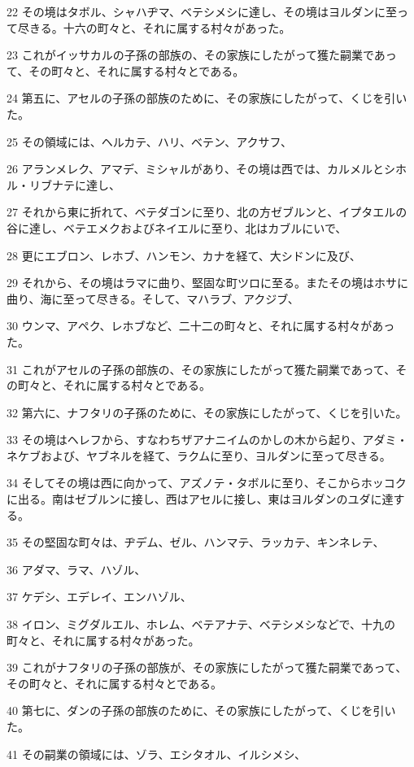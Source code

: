 \par 22 その境はタボル、シャハヂマ、ベテシメシに達し、その境はヨルダンに至って尽きる。十六の町々と、それに属する村々があった。
\par 23 これがイッサカルの子孫の部族の、その家族にしたがって獲た嗣業であって、その町々と、それに属する村々とである。
\par 24 第五に、アセルの子孫の部族のために、その家族にしたがって、くじを引いた。
\par 25 その領域には、ヘルカテ、ハリ、ベテン、アクサフ、
\par 26 アランメレク、アマデ、ミシャルがあり、その境は西では、カルメルとシホル・リブナテに達し、
\par 27 それから東に折れて、ベテダゴンに至り、北の方ゼブルンと、イプタエルの谷に達し、ベテエメクおよびネイエルに至り、北はカブルにいで、
\par 28 更にエブロン、レホブ、ハンモン、カナを経て、大シドンに及び、
\par 29 それから、その境はラマに曲り、堅固な町ツロに至る。またその境はホサに曲り、海に至って尽きる。そして、マハラブ、アクジブ、
\par 30 ウンマ、アペク、レホブなど、二十二の町々と、それに属する村々があった。
\par 31 これがアセルの子孫の部族の、その家族にしたがって獲た嗣業であって、その町々と、それに属する村々とである。
\par 32 第六に、ナフタリの子孫のために、その家族にしたがって、くじを引いた。
\par 33 その境はヘレフから、すなわちザアナニイムのかしの木から起り、アダミ・ネケブおよび、ヤブネルを経て、ラクムに至り、ヨルダンに至って尽きる。
\par 34 そしてその境は西に向かって、アズノテ・タボルに至り、そこからホッコクに出る。南はゼブルンに接し、西はアセルに接し、東はヨルダンのユダに達する。
\par 35 その堅固な町々は、ヂデム、ゼル、ハンマテ、ラッカテ、キンネレテ、
\par 36 アダマ、ラマ、ハゾル、
\par 37 ケデシ、エデレイ、エンハゾル、
\par 38 イロン、ミグダルエル、ホレム、ベテアナテ、ベテシメシなどで、十九の町々と、それに属する村々があった。
\par 39 これがナフタリの子孫の部族が、その家族にしたがって獲た嗣業であって、その町々と、それに属する村々とである。
\par 40 第七に、ダンの子孫の部族のために、その家族にしたがって、くじを引いた。
\par 41 その嗣業の領域には、ゾラ、エシタオル、イルシメシ、
